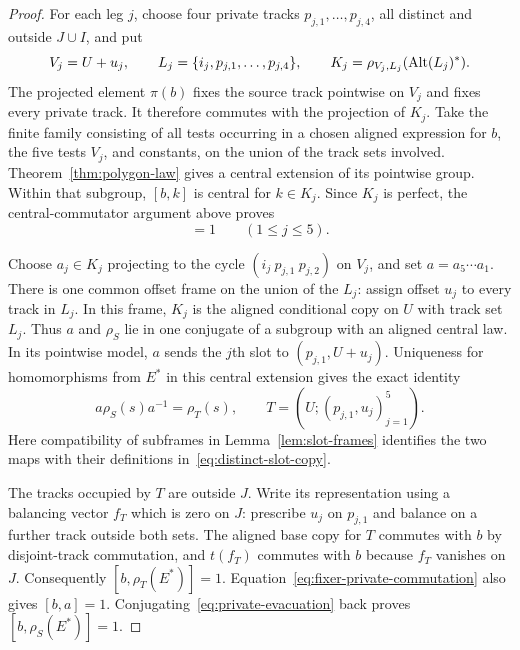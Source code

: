 \begin{proof}
For each leg $j$, choose four private tracks
$p_{j,1},\ldots,p_{j,4}$, all distinct and outside $J\cup I$, and put
\[
 V_j=U+u_j,
 \qquad L_j=\{i_j,p_{j,1},\ldots,p_{j,4}\},
 \qquad K_j=\rho_{V_j,L_j}(\operatorname{Alt}(L_j)^\ast).
\]
The projected element $\pi(b)$ fixes the source track pointwise on $V_j$
and fixes every private track.  It therefore commutes with the projection
of $K_j$.  Take the finite family consisting of all tests occurring in a
chosen aligned expression for $b$, the five tests $V_j$, and constants,
on the union of the track sets involved.  Theorem~\ref{thm:polygon-law}
gives a central extension of its pointwise group.  Within that subgroup,
$[b,k]$ is central for $k\in K_j$.  Since $K_j$ is perfect, the
central-commutator argument above proves
\begin{equation}
 [b,K_j]=1\qquad (1\leq j\leq5).
 \label{eq:fixer-private-commutation}
\end{equation}

Choose $a_j\in K_j$ projecting to the cycle
$(i_j\ p_{j,1}\ p_{j,2})$ on $V_j$, and set $a=a_5\cdots a_1$.
There is one common offset frame on the union of the $L_j$: assign offset
$u_j$ to every track in $L_j$.  In this frame, $K_j$ is the aligned
conditional copy on $U$ with track set $L_j$.  Thus $a$ and $\rho_S$ lie
in one conjugate of a subgroup with an aligned central law.  In its
pointwise model, $a$ sends the $j$th slot to
$(p_{j,1},U+u_j)$.  Uniqueness for homomorphisms from $E^\ast$ in this
central extension gives the exact identity
\begin{equation}
 a\rho_S(s)a^{-1}=\rho_T(s),
 \qquad T=(U;(p_{j,1},u_j)_{j=1}^5).
 \label{eq:private-evacuation}
\end{equation}
Here compatibility of subframes in Lemma~\ref{lem:slot-frames} identifies
the two maps with their definitions in~\eqref{eq:distinct-slot-copy}.

The tracks occupied by $T$ are outside $J$.  Write its representation
using a balancing vector $f_T$ which is zero on $J$: prescribe $u_j$ on
$p_{j,1}$ and balance on a further track outside both sets.  The aligned
base copy for $T$ commutes with $b$ by disjoint-track commutation, and
$t(f_T)$ commutes with $b$ because $f_T$ vanishes on $J$.  Consequently
$[b,\rho_T(E^\ast)]=1$.  Equation~\eqref{eq:fixer-private-commutation}
also gives $[b,a]=1$.  Conjugating~\eqref{eq:private-evacuation} back proves
$[b,\rho_S(E^\ast)]=1$.
\end{proof}

